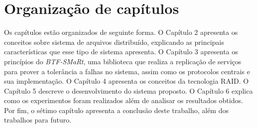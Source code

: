 
	\section{Organização de capítulos}
	
	Os capítulos estão organizados de seguinte forma. 
	O Capítulo 2 apresenta os conceitos sobre sistema de arquivos distribuído, explicando as principais características que esse tipo de sistema apresenta.  
	O Capítulo 3 apresenta os princípios do \textit{BTF-SMaRt}, uma biblioteca que realiza a replicação de serviços para prover a tolerância a falhas no sistema, assim como os protocolos centrais e sua implementação.
	O Capítulo 4 apresenta os conceitos da tecnologia RAID.
	O Capítulo 5 descreve o desenvolvimento do sistema proposto.
	O Capítulo 6 explica como os experimentos foram realizados além de analisar os resultados obtidos.
	Por fim, o sétimo capítulo apresenta a conclusão deste trabalho, além dos trabalhos para futuro.